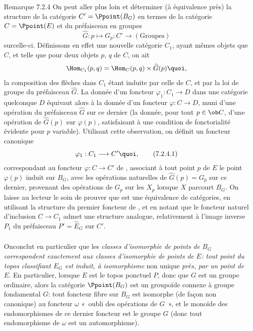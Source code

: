 \begin{enonce*}[remark]{Remarque 7.2.4}
On peut aller plus loin et déterminer (à équivalence près) la
structure de la catégorie $C'=\Ppoint(B_G)$ en termes de la
catégorie $C=\Ppoint(E)$ et du préfaisceau en groupes
$$
\widehat{G}:p\longmapsto G_p: C^{\circ}\longrightarrow
(\text{Groupes})
$$
sur\pageoriginale celle-ci. Définissons en effet une nouvelle
catégorie $C_1$, ayant mêmes objets que $C$, et telle que pour deux
objets $p$, $q$ de $C$, on ait
$$
\Hom_{C_1}(p,q)=\Hom_C(p,q)\times \widehat{G}(p){\quoi},
$$
la composition des flèches dans $C_1$ étant induite par celle de
$C$, et par la loi de groupe du préfaisceau $\widehat{G}$. La donnée
d'un foncteur $\varphi_1:C_1\rightarrow D$ dans une catégorie
quelconque $D$ équivaut alors à la donnée d'un foncteur
$\varphi:C\rightarrow D$, muni d'une opération du préfaisceau
$\widehat{G}$ sur ce dernier (\ie la donnée, pour tout $p\in \ob C$,
d'une opération de $\widehat{G}(p)$ sur $\varphi(p)$, satisfaisant à
une condition de fonctorialité évidente pour $p$ variable).
Utilisant cette observation, on définit un foncteur canonique
\begin{equation*}
\varphi_1:C_1\longrightarrow C'{\quoi},\tag{7.2.4.1}
\end{equation*}
correspondant au foncteur $\varphi:C\rightarrow C'$ de
, associant à tout point $p$ de $E$ le point
$\varphi(p)$ induit sur $B_G$, avec les opérations naturelles de
$\widehat{G}(p)=G_p$ sur ce dernier, provenant des opérations de
$G_p$ sur les $X_p$ lorsque $X$ parcourt $B_G$. On laisse au lecteur
le soin de prouver que  est une équivalence de
catégories, en utilisant la structure  du premier
foncteur de , et en notant que le foncteur naturel
d'inclusion $C\rightarrow C_1$ admet une structure analogue,
relativement à l'image inverse $P_1$ du préfaisceau
$P'=\widehat{E}_G$ sur $C'$.
\end{enonce*}

\setcounter{subsubsection}{4}
\subsubsection{}
On\pageoriginale conclut en particulier que les \emph{classes
d'isomorphie de points de $B_G$ correspondent exactement aux classes
d'isomorphie de points de $E$: tout point du topos classifiant $E_G$
est induit, à isomorphisme} non unique \emph{près, par un point de
$E$}. En particulier, lorsque $E$ est le topos ponctuel $P$, donc
que $G$ est un groupe ordinaire, alors la catégorie $\Ppoint(B_G)$
est un groupoïde connexe à groupe fondamental $G$: tout foncteur
fibre sur $B_G$ est isomorphe (de façon non canonique) au
foncteur $\omega$ « oubli des opérations de $G$ », et le monoïde
des endomorphismes de ce dernier foncteur est le groupe $G$ (donc
tout endomorphisme de $\omega$ est un automorphisme).

